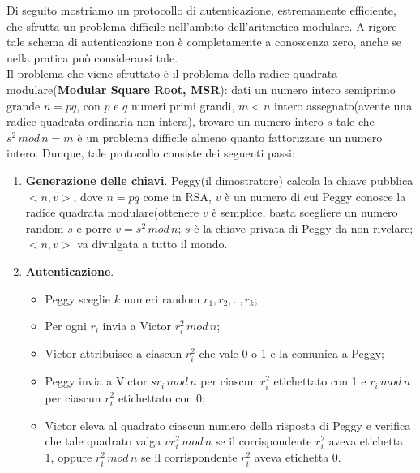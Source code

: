 Di seguito mostriamo un protocollo di autenticazione, estremamente efficiente, che sfrutta un problema difficile nell'ambito dell'aritmetica modulare. A rigore tale schema di autenticazione non è
completamente a conoscenza zero, anche se nella pratica può considerarsi tale. \\
Il problema che viene sfruttato è il problema della radice quadrata modulare(\textbf{Modular Square Root, MSR}): dati un numero intero semiprimo grande $n=pq$, con $p$ e $q$ numeri primi grandi, $m<n$ intero assegnato(avente una radice quadrata ordinaria non intera), trovare un numero intero $s$ tale che $s^2 \, mod \, n=m$ è un problema difficile almeno quanto fattorizzare un numero intero.
Dunque, tale protocollo consiste dei seguenti passi: \begin{enumerate}
\item \textbf{Generazione delle chiavi}. Peggy(il dimostratore) calcola la chiave pubblica $<n,v>$, dove $n=pq$ come in RSA, $v$ è un numero di cui Peggy conosce la radice quadrata modulare(ottenere $v$ è semplice, basta scegliere un numero random $s$ e porre $v = s^2 \, mod \, n$; $s$ è la chiave privata di Peggy da non rivelare; $<n,v>$ va divulgata a tutto il mondo.
\item \textbf{Autenticazione}. \begin{itemize}
\item Peggy sceglie $k$ numeri random $r_{1},r_{2},..,r_{k}$;
\item Per ogni $r_{i}$ invia a Victor $r_{i}^2 \, mod \, n$;
\item Victor attribuisce a ciascun $r_{i}^2$ che vale 0 o 1 e la comunica a Peggy;
\item Peggy invia a Victor $sr_{i} \, mod \, n$ per ciascun $r_{i}^2$ etichettato con 1 e $r_{i} \, mod \, n$ per ciascun $r_{i}^2$ etichettato con 0;
\item Victor eleva al quadrato ciascun numero della risposta di Peggy e verifica che tale quadrato valga $vr_{i}^2 \, mod \, n$ se il corrispondente $r_{i}^2$ aveva etichetta 1, oppure $r_{i}^2 \, mod \, n$ se il corrispondente $r_{i}^2$ aveva etichetta 0.
\end{itemize}
\end{enumerate}

